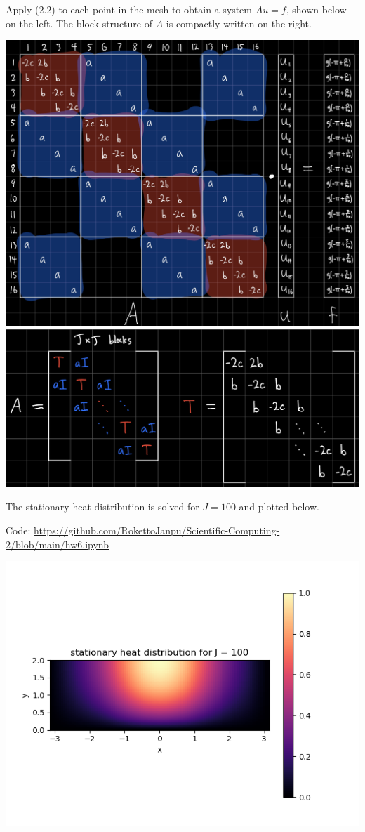 \documentclass{article}
\begin{document}
Apply (2.2) to each point in the mesh to obtain a system $Au=f$, shown below on the left. The block structure of $A$ is compactly written on the right.

\includegraphics[scale=.1]{hw6 2 full}
\includegraphics[scale=.09]{hw6 2 block}

The stationary heat distribution is solved for $J=100$ and plotted below.

Code: \url{https://github.com/RokettoJanpu/Scientific-Computing-2/blob/main/hw6.ipynb}

\begin{center}
	\includegraphics[scale=1]{hw6 2 plot}
\end{center}
\end{document}
